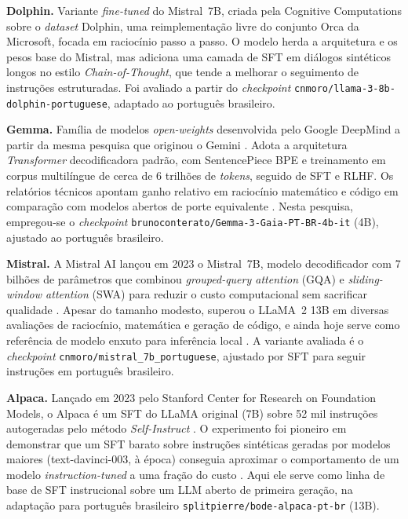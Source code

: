 \textbf{Dolphin.} Variante \textit{fine-tuned} do Mistral~7B, criada pela Cognitive Computations sobre o \textit{dataset} Dolphin, uma reimplementação livre do conjunto Orca da Microsoft, focada em raciocínio passo a passo. O modelo herda a arquitetura e os pesos base do Mistral, mas adiciona uma camada de SFT em diálogos sintéticos longos no estilo \textit{Chain-of-Thought}, que tende a melhorar o seguimento de instruções estruturadas. Foi avaliado a partir do \textit{checkpoint} \texttt{cnmoro/llama-3-8b-dolphin-portuguese}, adaptado ao português brasileiro.

\textbf{Gemma.} Família de modelos \textit{open-weights} desenvolvida pelo Google DeepMind a partir da mesma pesquisa que originou o Gemini \cite{gemma2024}. Adota a arquitetura \textit{Transformer} decodificadora padrão, com SentencePiece BPE e treinamento em corpus multilíngue de cerca de 6 trilhões de \textit{tokens}, seguido de SFT e RLHF. Os relatórios técnicos apontam ganho relativo em raciocínio matemático e código em comparação com modelos abertos de porte equivalente \cite{gemma2024}. Nesta pesquisa, empregou-se o \textit{checkpoint} \texttt{brunoconterato/Gemma-3-Gaia-PT-BR-4b-it} (4B), ajustado ao português brasileiro.

\textbf{Mistral.} A Mistral AI lançou em 2023 o Mistral~7B, modelo decodificador com 7 bilhões de parâmetros que combinou \textit{grouped-query attention} (GQA) e \textit{sliding-window attention} (SWA) para reduzir o custo computacional sem sacrificar qualidade \cite{jiang2023}. Apesar do tamanho modesto, superou o LLaMA~2 13B em diversas avaliações de raciocínio, matemática e geração de código, e ainda hoje serve como referência de modelo enxuto para inferência local \cite{jiang2023}. A variante avaliada é o \textit{checkpoint} \texttt{cnmoro/mistral\_7b\_portuguese}, ajustado por SFT para seguir instruções em português brasileiro.

\textbf{Alpaca.} Lançado em 2023 pelo Stanford Center for Research on Foundation Models, o Alpaca é um SFT do LLaMA original (7B) sobre 52 mil instruções autogeradas pelo método \textit{Self-Instruct} \cite{taori2023}. O experimento foi pioneiro em demonstrar que um SFT barato sobre instruções sintéticas geradas por modelos maiores (text-davinci-003, à época) conseguia aproximar o comportamento de um modelo \textit{instruction-tuned} a uma fração do custo \cite{taori2023}. Aqui ele serve como linha de base de SFT instrucional sobre um LLM aberto de primeira geração, na adaptação para português brasileiro \texttt{splitpierre/bode-alpaca-pt-br} (13B).

